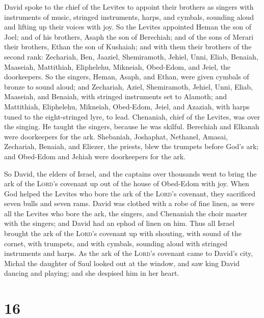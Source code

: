  David spoke to the chief of the Levites to appoint their
brothers as singers with instruments of music, stringed instruments,
harps, and cymbals, sounding aloud and lifting up their voices with joy.
 So the Levites appointed Heman the son of Joel; and of
his brothers, Asaph the son of Berechiah; and of the sons of Merari
their brothers, Ethan the son of Kushaiah;  and with them
their brothers of the second rank: Zechariah, Ben, Jaaziel, Shemiramoth,
Jehiel, Unni, Eliab, Benaiah, Maaseiah, Mattithiah, Eliphelehu,
Mikneiah, Obed-Edom, and Jeiel, the doorkeepers.  So the
singers, Heman, Asaph, and Ethan, were given cymbals of bronze to sound
aloud;  and Zechariah, Aziel, Shemiramoth, Jehiel, Unni,
Eliab, Maaseiah, and Benaiah, with stringed instruments set to Alamoth;
 and Mattithiah, Eliphelehu, Mikneiah, Obed-Edom, Jeiel,
and Azaziah, with harps tuned to the eight-stringed lyre, to lead.
 Chenaniah, chief of the Levites, was over the singing.
He taught the singers, because he was skilful.  Berechiah
and Elkanah were doorkeepers for the ark.  Shebaniah,
Joshaphat, Nethanel, Amasai, Zechariah, Benaiah, and Eliezer, the
priests, blew the trumpets before God's ark; and Obed-Edom and Jehiah
were doorkeepers for the ark.

 So David, the elders of Israel, and the captains over
thousands went to bring the ark of the \textsc{Lord}'s covenant up out
of the house of Obed-Edom with joy.  When God helped the
Levites who bore the ark of the \textsc{Lord}'s covenant, they
sacrificed seven bulls and seven rams.  David was clothed
with a robe of fine linen, as were all the Levites who bore the ark, the
singers, and Chenaniah the choir master with the singers; and David had
an ephod of linen on him.  Thus all Israel brought the
ark of the \textsc{Lord}'s covenant up with shouting, with sound of the
cornet, with trumpets, and with cymbals, sounding aloud with stringed
instruments and harps.  As the ark of the \textsc{Lord}'s
covenant came to David's city, Michal the daughter of Saul looked out at
the window, and saw king David dancing and playing; and she despised him
in her heart.

\hypertarget{section-15}{%
\section{16}\label{section-15}}

